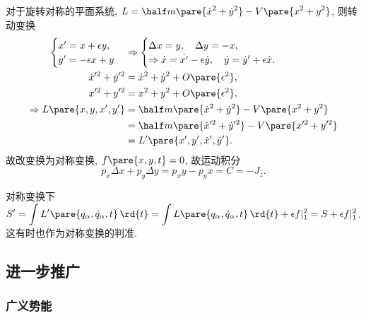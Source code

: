 \documentclass{ctexart}
\begin{document}
\begin{sample}
    \begin{ex}
        对于旋转对称的平面系统, $L = \displaystyle \half m\pare{\dot{x}^2 + \dot{y}^2} - V\pare{x^2+y^2}$, 则转动变换
        \begin{align*}
            \begin{cases}
                x' = x+\epsilon y,\\
                y' = -\epsilon x + y
            \end{cases} & \Rightarrow \begin{cases}
                \Delta x = y,\quad \Delta y = -x, \\
                \Rightarrow \dot{x} = \dot{x'} - \epsilon \dot{y},\quad \dot{y} = \dot{y}' + \epsilon \dot{x}.
            \end{cases}\\
            \dot{x}'^2 + \dot{y}'^2 &= \dot{x}^2 + \dot{y}^2 + O\pare{\epsilon^2},\\
            x'^2 + y'^2 &= x^2 + y^2 + O\pare{\epsilon^2}, \\
            \Rightarrow L\pare{x,y,x',y'} &= \half m\pare{\dot{x}^2 + \dot{y}^2} - V\pare{x^2 + y^2} \\
            &= \half m\pare{\dot{x}'^2 + \dot{y}'^2} - V\pare{x'^2 + y'^2} \\
            &= L'\pare{x', y', \dot{x}', \dot{y}'}.
        \end{align*}
        故改变换为对称变换, $f\pare{x,y,t} = 0$, 故运动积分
        \[ p_x \Delta x + p_y \Delta y = p_x y - p_y x = C = -J_z. \]
    \end{ex}
\end{sample}
对称变换下$\displaystyle S' = \int L'\pare{q_\alpha, \dot{q}_\alpha, t}\,\rd{t} = \int L\pare{q_\alpha, \dot{q}_\alpha, t}\,\rd{t} + \epsilon f\vert_1^2 = S + \epsilon f\vert_1^2$. 这有时也作为对称变换的判准.



\subsection{进一步推广} %
\label{sub:进一步推广}

\subsubsection{广义势能} %
\label{ssub:广义势能}
\end{document}
